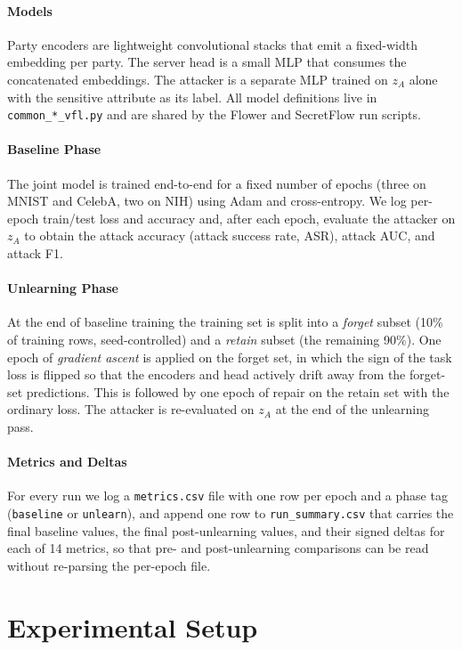 \documentclass[sigconf,anonymous]{acmart}
\begin{document}
\paragraph{Models}
Party encoders are lightweight convolutional stacks that emit a fixed-width embedding per party. The server head is a small MLP that consumes the concatenated embeddings. The attacker is a separate MLP trained on $z_A$ alone with the sensitive attribute as its label. All model definitions live in \texttt{common\_*\_vfl.py} and are shared by the Flower and SecretFlow run scripts.

\paragraph{Baseline Phase}
The joint model is trained end-to-end for a fixed number of epochs (three on MNIST and CelebA, two on NIH) using Adam and cross-entropy. We log per-epoch train/test loss and accuracy and, after each epoch, evaluate the attacker on $z_A$ to obtain the attack accuracy (attack success rate, ASR), attack AUC, and attack F1.

\paragraph{Unlearning Phase}
At the end of baseline training the training set is split into a \emph{forget} subset (10\% of training rows, seed-controlled) and a \emph{retain} subset (the remaining 90\%). One epoch of \emph{gradient ascent} is applied on the forget set, in which the sign of the task loss is flipped so that the encoders and head actively drift away from the forget-set predictions. This is followed by one epoch of repair on the retain set with the ordinary loss. The attacker is re-evaluated on $z_A$ at the end of the unlearning pass.

\paragraph{Metrics and Deltas}
For every run we log a \texttt{metrics.csv} file with one row per epoch and a phase tag (\texttt{baseline} or \texttt{unlearn}), and append one row to \texttt{run\_summary.csv} that carries the final baseline values, the final post-unlearning values, and their signed deltas for each of 14 metrics, so that pre- and post-unlearning comparisons can be read without re-parsing the per-epoch file.

\section{Experimental Setup}
\end{document}

